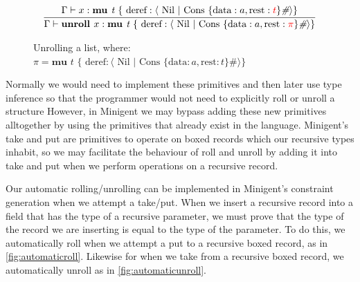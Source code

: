 \begin{figure}
    \centering
    \begin{align*}
        \infer{
            \Gamma \vdash \textbf{unroll } x : \textbf{mu } \textit{t } \{ \text{ deref}: \langle \text{ Nil } \vert \text{ Cons } \{ \text{data}: a, \text{rest}: {\color{red} \pi}  \}\textit{\#} \rangle \} 
        }{
            \Gamma \vdash x : \textbf{mu } \textit{t } \{ \text{ deref}: \langle \text{ Nil } \vert \text{ Cons } \{ \text{data}: a, \text{rest}: {\color{red} t} \}\textit{\#} \rangle \} 
        }
    \end{align*}
    \caption{Unrolling a list, where: \newline \protect\phantom{Figure x.x:} $\pi = \textbf{mu } \textit{t } \{ \text{ deref}: \langle \text{ Nil } \vert \text{ Cons } \{ \text{data}: a, \text{rest}: t \}\textit{\#} \rangle \}$}
    \label{fig:unrollexample}
\end{figure}

Normally we would need to implement these primitives and then later use type inference so that
the programmer would not need to explicitly roll or unroll a structure However,
in Minigent we may bypass adding these new primitives alltogether by using the primitives
that already exist in the language. Minigent's \textsf{take} and \textsf{put} are primitives to
operate on boxed records which our recursive types inhabit, so we may facilitate the behaviour
of roll and unroll by adding it into take and put when we perform operations on a recursive record.

Our automatic rolling/unrolling can be implemented in Minigent's constraint generation when we attempt a \textsf{take}/\textsf{put}.
When we insert a recursive record into a field that has the type of a recursive parameter, we must prove that the type of the record
we are inserting is equal to the type of the parameter. To do this, we automatically roll
when we attempt a \textsf{put} to a recursive boxed record, as in \autoref{fig:automaticroll}.
Likewise for when we \textsf{take} from a recursive boxed record, 
we automatically unroll as in \autoref{fig:automaticunroll}.

